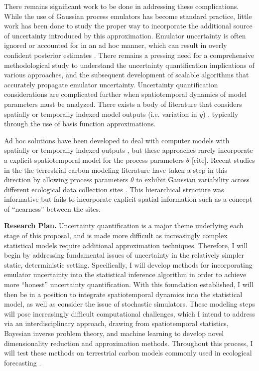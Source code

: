 \documentclass[12pt]{article}
\begin{document}
 There remains significant work to be done in addressing these complications. While the use of Gaussian process emulators has become standard practice, little work has been done to study the proper way to incorporate the additional source of uncertainty introduced by this approximation. Emulator uncertainty is often ignored or accounted for in an ad hoc manner, which can result in overly confident posterior estimates \cite{Cleary, Fer}. There remains a pressing need for a comprehensive methodological study to understand the uncertainty quantification implications of various approaches, and the subsequent development of scalable algorithms that accurately propagate emulator uncertainty. Uncertainty quantification considerations are complicated further when spatiotemporal dynamics of model parameters must be analyzed. There exists a body of literature that considers spatially or temporally indexed model outputs (i.e. variation in $y$) \cite{Sun}, typically through the use of basis function approximations. 
 
 Ad hoc solutions have been developed to deal with computer models with spatially or temporally indexed outputs \cite{Sun}, but these approaches rarely incorporate a
 explicit spatiotemporal model for the process parameters $\theta$ [cite]. Recent studies in the the terrestrial carbon modeling literature have 
 taken a step in this direction by allowing process parameters $\theta$ to exhibit Gaussian variability across different ecological data collection
sites \cite{Fer2}. This hierarchical structure was informative but fails to incorporate explicit spatial information such as a concept of ``nearness'' between the sites. 

\noindent
\textbf{Research Plan.} Uncertainty quantification is a major theme underlying each stage of this proposal, and is made more difficult
as increasingly complex statistical models require additional approximation techniques. Therefore, I will begin by addressing fundamental issues of uncertainty in the relatively simpler static, deterministic setting. Specifically, I will develop methods for incorporating emulator uncertainty into the statistical inference algorithm in order to achieve more ``honest'' uncertainty quantification. With this foundation established, I will then be in a position to integrate spatiotemporal dynamics into the statistical model, as well as consider the issue of stochastic simulators. These modeling steps will pose increasingly difficult computational challenges, which I intend to address via an interdisciplinary approach, drawing from spatiotemporal statistics, Bayesian inverse problem theory, and machine learning to develop novel dimensionality reduction and approximation methods. Throughout this process, I will test these methods on terrestrial carbon models commonly used in ecological forecasting \cite{Dietze, Canadell}. 
 
\end{document}
